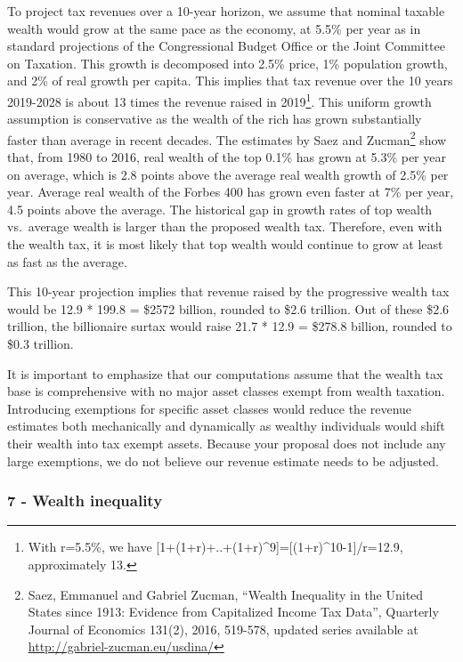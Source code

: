 \documentclass[]{article}
\let\rmarkdownfootnote\footnote%
\def\footnote{\protect\rmarkdownfootnote}
\begin{document}
To project tax revenues over a 10-year horizon, we assume that nominal
taxable wealth would grow at the same pace as the economy, at 5.5\% per
year as in standard projections of the Congressional Budget Office or
the Joint Committee on Taxation. This growth is decomposed into 2.5\%
price, 1\% population growth, and 2\% of real growth per capita. This
implies that tax revenue over the 10 years 2019-2028 is about 13 times
the revenue raised in 2019\footnote{With r=5.5\%, we have
  {[}1+(1+r)+..+(1+r)\^{}9{]}={[}(1+r)\^{}10-1{]}/r=12.9, approximately
  13.}. This uniform growth assumption is conservative as the wealth of
the rich has grown substantially faster than average in recent decades.
The estimates by Saez and Zucman\footnote{Saez, Emmanuel and Gabriel
  Zucman, ``Wealth Inequality in the United States since 1913: Evidence
  from Capitalized Income Tax Data'', Quarterly Journal of Economics
  131(2), 2016, 519-578, updated series available at
  \url{http://gabriel-zucman.eu/usdina/}} show that, from 1980 to 2016,
real wealth of the top 0.1\% has grown at 5.3\% per year on average,
which is 2.8 points above the average real wealth growth of 2.5\% per
year. Average real wealth of the Forbes 400 has grown even faster at 7\%
per year, 4.5 points above the average. The historical gap in growth
rates of top wealth vs.~average wealth is larger than the proposed
wealth tax. Therefore, even with the wealth tax, it is most likely that
top wealth would continue to grow at least as fast as the average.

This 10-year projection implies that revenue raised by the progressive
wealth tax would be 12.9 * 199.8 = \$2572 billion, rounded to \$2.6
trillion. Out of these \$2.6 trillion, the billionaire surtax would
raise 21.7 * 12.9 = \$278.8 billion, rounded to \$0.3 trillion.

It is important to emphasize that our computations assume that the
wealth tax base is comprehensive with no major asset classes exempt from
wealth taxation. Introducing exemptions for specific asset classes would
reduce the revenue estimates both mechanically and dynamically as
wealthy individuals would shift their wealth into tax exempt assets.
Because your proposal does not include any large exemptions, we do not
believe our revenue estimate needs to be adjusted.

\hypertarget{wealth-inequality}{%
\subsubsection{7 - Wealth inequality}\label{wealth-inequality}}
\end{document}
